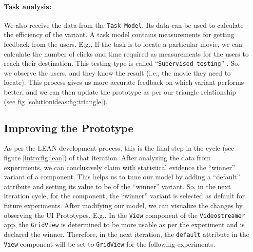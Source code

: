
\paragraph{Task analysis:}
\label{solutionideas:paragraph:taskanalysis}
We also receive the data from the \texttt{Task Model}. 
Its data can be used to calculate the efficiency of the variant. 
A task model contains measurements for getting feedback from the users. 
E.g., If the task is to locate a particular movie, we can calculate the number of clicks and time required as measurements for the users to reach their destination.
This testing type is called ``\texttt{Supervised testing}'' \cite{article:dataanalysis:supervisedtest}.
So, we observe the users, and they know the result (i.e., the movie they need to locate). 
This process gives us more accurate feedback on which variant performs better, and we can then update the prototype as per our triangle relationship (see fig \ref{solutionideas:fig:triangle}).

\subsection{Improving the Prototype}
\label{solutionideas:subsection:improvingprototypes}
As per the LEAN development process, this is the final step in the cycle (see figure \ref{intro:fig:lean}) of that iteration.
After analyzing the data from experiments, we can conclusively claim with statistical evidence the ``winner'' variant of a component.
This helps us to tune our model by adding a ``default'' attribute and setting its value to be of the ``winner'' variant.
So, in the next iteration cycle, for the component, the ``winner'' variant is selected as default for future experiments.
After modifying our model, we can visualize the changes by observing the UI Prototypes.
E.g., In the \texttt{View} component of the \texttt{Videostreamer} app, the \texttt{GridView} is determined to be more usable as per the experiment and is declared the winner. 
Therefore, in the next iteration, the \texttt{default} attribute in the \texttt{View} component will be set to \texttt{GridView} for the following experiments.